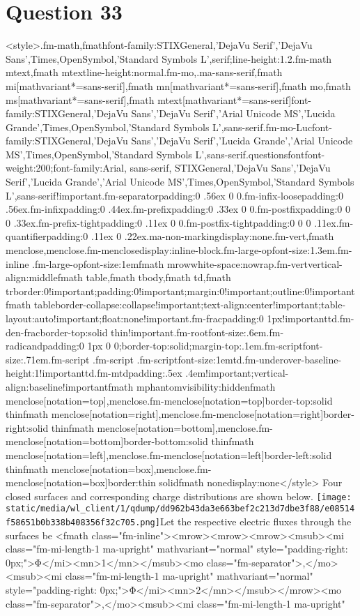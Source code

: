 \documentclass{article}
\begin{document}
\section*{Question 33}
<style>.fm-math,fmath{font-family:STIXGeneral,'DejaVu Serif','DejaVu Sans',Times,OpenSymbol,'Standard Symbols L',serif;line-height:1.2}.fm-math mtext,fmath mtext{line-height:normal}.fm-mo,.ma-sans-serif,fmath mi[mathvariant*=sans-serif],fmath mn[mathvariant*=sans-serif],fmath mo,fmath ms[mathvariant*=sans-serif],fmath mtext[mathvariant*=sans-serif]{font-family:STIXGeneral,'DejaVu Sans','DejaVu Serif','Arial Unicode MS','Lucida Grande',Times,OpenSymbol,'Standard Symbols L',sans-serif}.fm-mo-Luc{font-family:STIXGeneral,'DejaVu Sans','DejaVu Serif','Lucida Grande','Arial Unicode MS',Times,OpenSymbol,'Standard Symbols L',sans-serif}.questionsfont{font-weight:200;font-family:Arial, sans-serif, STIXGeneral,'DejaVu Sans','DejaVu Serif','Lucida Grande','Arial Unicode MS',Times,OpenSymbol,'Standard Symbols L',sans-serif!important}.fm-separator{padding:0 .56ex 0 0}.fm-infix-loose{padding:0 .56ex}.fm-infix{padding:0 .44ex}.fm-prefix{padding:0 .33ex 0 0}.fm-postfix{padding:0 0 0 .33ex}.fm-prefix-tight{padding:0 .11ex 0 0}.fm-postfix-tight{padding:0 0 0 .11ex}.fm-quantifier{padding:0 .11ex 0 .22ex}.ma-non-marking{display:none}.fm-vert,fmath menclose,menclose.fm-menclose{display:inline-block}.fm-large-op{font-size:1.3em}.fm-inline .fm-large-op{font-size:1em}fmath mrow{white-space:nowrap}.fm-vert{vertical-align:middle}fmath table,fmath tbody,fmath td,fmath tr{border:0!important;padding:0!important;margin:0!important;outline:0!important}fmath table{border-collapse:collapse!important;text-align:center!important;table-layout:auto!important;float:none!important}.fm-frac{padding:0 1px!important}td.fm-den-frac{border-top:solid thin!important}.fm-root{font-size:.6em}.fm-radicand{padding:0 1px 0 0;border-top:solid;margin-top:.1em}.fm-script{font-size:.71em}.fm-script .fm-script .fm-script{font-size:1em}td.fm-underover-base{line-height:1!important}td.fm-mtd{padding:.5ex .4em!important;vertical-align:baseline!important}fmath mphantom{visibility:hidden}fmath menclose[notation=top],menclose.fm-menclose[notation=top]{border-top:solid thin}fmath menclose[notation=right],menclose.fm-menclose[notation=right]{border-right:solid thin}fmath menclose[notation=bottom],menclose.fm-menclose[notation=bottom]{border-bottom:solid thin}fmath menclose[notation=left],menclose.fm-menclose[notation=left]{border-left:solid thin}fmath menclose[notation=box],menclose.fm-menclose[notation=box]{border:thin solid}fmath none{display:none}</style> Four closed surfaces and corresponding charge distributions are shown below. \texttt{[image: static/media/wl\_client/1/qdump/dd962b43da3e663bef2c213d7dbe3f88/e08514f58651b0b338b408356f32c705.png]}Let the respective electric fluxes through the surfaces be <fmath class="fm-inline"><mrow><mrow><mrow><msub><mi class="fm-mi-length-1 ma-upright" mathvariant="normal" style="padding-right: 0px;">Φ</mi><mn>1</mn></msub><mo class="fm-separator">,</mo><msub><mi class="fm-mi-length-1 ma-upright" mathvariant="normal" style="padding-right: 0px;">Φ</mi><mn>2</mn></msub></mrow><mo class="fm-separator">,</mo><msub><mi class="fm-mi-length-1 ma-upright" 
\end{document}
